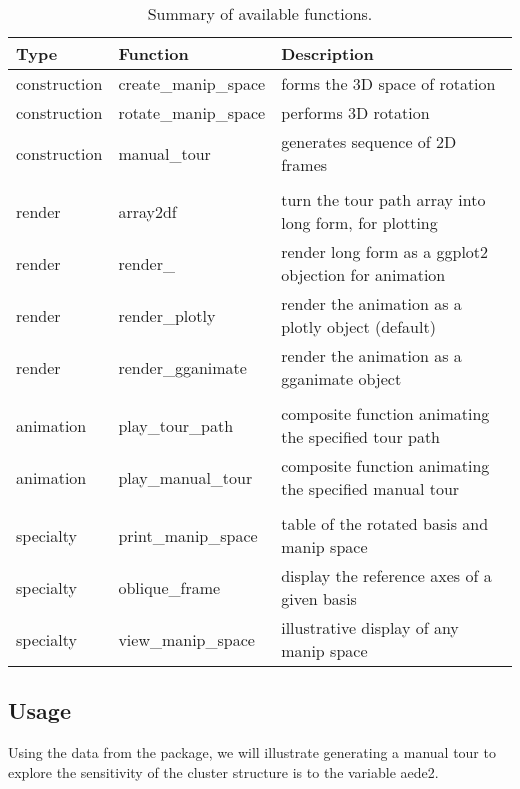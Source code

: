 \begin{Schunk}
\begin{table}

\caption{\label{tab:functionsTable}Summary of available functions.}
\centering
\begin{tabular}[t]{lll}
\toprule
Type & Function & Description\\
\midrule
construction & create\_manip\_space & forms the 3D space of rotation\\
construction & rotate\_manip\_space & performs 3D rotation\\
construction & manual\_tour & generates sequence of 2D frames\\
 &  & \\
render & array2df & turn the tour path array into long form, for plotting\\
render & render\_ & render long form as a ggplot2 objection for animation\\
render & render\_plotly & render the animation as a plotly object (default)\\
render & render\_gganimate & render the animation as a gganimate object\\
 &  & \\
animation & play\_tour\_path & composite function animating the specified tour path\\
animation & play\_manual\_tour & composite function animating the specified manual tour\\
 &  & \\
specialty & print\_manip\_space & table of the rotated basis and manip space\\
specialty & oblique\_frame & display the reference axes of a given basis\\
specialty & view\_manip\_space & illustrative display of any manip space\\
\bottomrule
\end{tabular}
\end{table}

\end{Schunk}

\hypertarget{sec:usage}{%
\subsection{Usage}\label{sec:usage}}

Using the  data from the  package, we will
illustrate generating a manual tour to explore the sensitivity of the
cluster structure is to the variable aede2.


